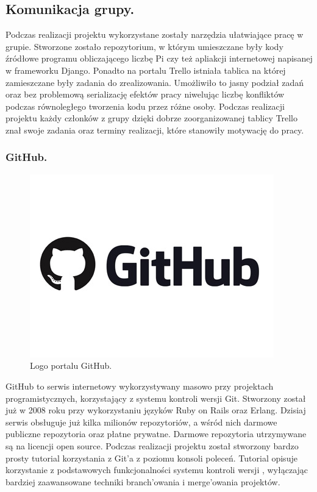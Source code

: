 \documentclass[a4paper,12pt]{article}		%
\begin{document}
\subsection{Komunikacja grupy.}
Podczas realizacji projektu wykorzystane zostały narzędzia ułatwiające pracę w grupie. Stworzone zostało repozytorium, w którym umieszczane były kody źródłowe programu obliczającego liczbę Pi czy też apliakcji internetowej napisanej w frameworku Django. Ponadto na portalu Trello istniała tablica na której zamieszczane były zadania do zrealizowania. Umożliwiło to jasny podział zadań oraz bez problemową serializację efektów pracy niwelując liczbę konfliktów podczas równoległego tworzenia kodu przez różne osoby. Podczas realizacji projektu każdy członków z grupy dzięki dobrze zoorganizowanej tablicy Trello znał swoje zadania oraz terminy realizacji, które stanowiły motywację do pracy.

\subsubsection{GitHub.}

\begin{figure}[h!]
\centering
\includegraphics[scale=0.6]{Resources/GitHub_Logo.jpg}
\caption{Logo portalu GitHub.} 
\end{figure}

GitHub to serwis internetowy wykorzystywany masowo przy projektach programistycznych, korzystający z systemu kontroli wersji Git. Stworzony został już w 2008 roku przy wykorzystaniu języków Ruby on Rails oraz Erlang. Dzisiaj serwis obsługuje już kilka milionów repozytoriów, a wśród nich darmowe publiczne repozytoria oraz płatne prywatne. Darmowe repozytoria utrzymywane są na licencji open source. Podczas realizacji projektu został stworzony bardzo prosty tutorial korzystania z Git'a z poziomu konsoli poleceń. Tutorial opisuje korzystanie z podstawowych funkcjonalności systemu kontroli wersji , wyłączając bardziej zaawansowane techniki branch'owania i merge'owania projektów.
\end{document}
